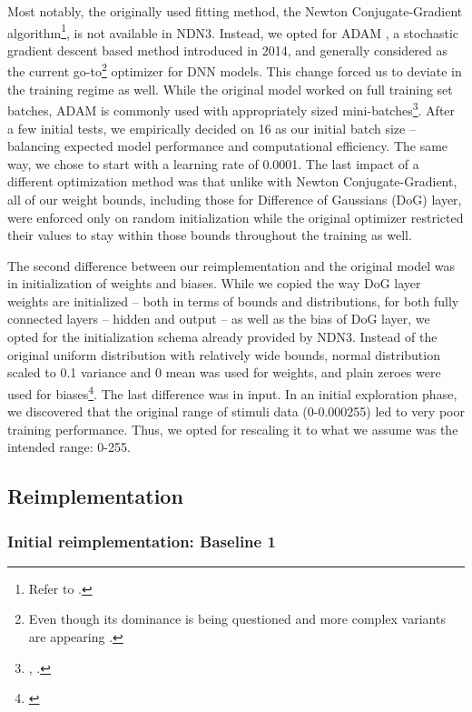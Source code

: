 Most notably, the originally used fitting method, the Newton Conjugate-Gradient algorithm\footnote{Refer to .}, is not available in NDN3. Instead, we opted for ADAM \citep{kingma2014adam}, a stochastic gradient descent based method introduced in 2014, and generally considered as the current go-to\footnote{Even though its dominance is being questioned \citep{2019arXiv191005446C} and more complex variants are appearing \citep{2019arXiv190803265L}.} optimizer for DNN models. This change forced us to deviate in the training regime as well. While the original model worked on full training set batches, ADAM is commonly used with appropriately sized mini-batches\footnote{\citep{2017arXiv170508741H}, \citep{2017arXiv171100489S}.}. After a few initial tests, we empirically decided on 16 as our initial batch size -- balancing expected model performance and computational efficiency. The same way, we chose to start with a learning rate of 0.0001. The last impact of a different optimization method was that unlike with Newton Conjugate-Gradient, all of our weight bounds, including those for Difference of Gaussians (DoG) layer, were enforced only on random initialization while the original optimizer restricted their values to stay within those bounds throughout the training as well.

The second difference between our reimplementation and the original model was in initialization of weights and biases. While we copied the way DoG layer weights are initialized -- both in terms of bounds and distributions, for both fully connected layers -- hidden and output -- as well as the bias of DoG layer, we opted for the initialization schema already provided by NDN3. Instead of the original uniform distribution with relatively wide bounds, normal distribution scaled to 0.1 variance and 0 mean was used for weights, and plain zeroes were used for biases\footnote{\citep{glorot}}. The last difference was in input. In an initial exploration phase, we discovered that the original range of stimuli data (0-0.000255) led to very poor training performance. Thus, we opted for rescaling it to what we assume was the intended range: 0-255.

\subsection{Reimplementation}
\subsubsection{Initial reimplementation: Baseline 1}

